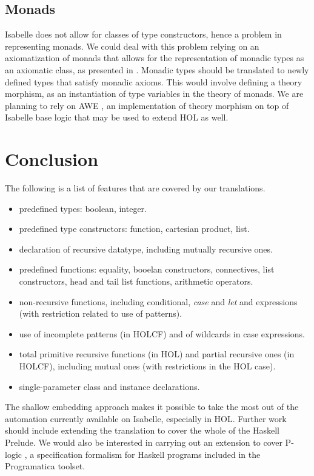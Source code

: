 \documentclass[a4paper,12pt]{article}
\begin{document}
\subsection{Monads}
\label{sec:Monads}

Isabelle does not allow for classes of type constructors, hence a
problem in representing monads. We could deal with this problem
relying on an axiomatization of monads that allows for the
representation of monadic types as an axiomatic class, as presented in
\cite{Lueth}. Monadic types should be translated to newly defined
types that satisfy monadic axioms. This would involve defining a
theory morphism, as an instantiation of type variables in the theory
of monads. We are planning to rely on AWE \cite{AWE}, an
implementation of theory morphism on top of Isabelle base logic that
may be used to extend HOL as well.


\section{Conclusion}

The following is a list of features that are covered by our
translations.

\begin{itemize} 
\item predefined types: boolean, integer.
\item predefined type constructors: function, cartesian product, list.
\item declaration of recursive datatype, including mutually recursive ones.
\item predefined functions: equality, booelan constructors,
  connectives, list constructors, head and tail list functions,
  arithmetic operators.
\item non-recursive functions, including conditional, \emph{case} and
  \emph{let} and expressions (with restriction related to use of
  patterns).
\item use of incomplete patterns (in HOLCF) and of wildcards in case
  expressions.
\item total primitive recursive functions (in HOL)
and partial recursive ones (in HOLCF), including mutual ones (with
restrictions in the HOL case).
\item single-parameter class and instance declarations.
\end{itemize}


The shallow embedding approach makes it possible to take the most out
of the automation currently available on Isabelle, especially in HOL.
Further work should include extending the translation to cover the
whole of the Haskell Prelude. We would also be interested in carrying
out an extension to cover P-logic \cite{KiebPl}, a specification
formalism for Haskell programs included in the Programatica toolset.




\end{document}

